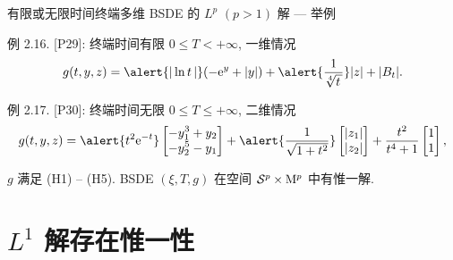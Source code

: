 \documentclass[xcolor=svgnames,serif,table,10pt]{beamer}
\newcommand{\s}{\mathcal{S}}
\newcommand{\me}{\mathrm{e}}
\renewcommand{\M}{{\rm M}}
\begin{document}
\begin{frame}{有限或无限时间终端多维 BSDE 的 $L^p$ $(p>1)$ 解 --- 举例}

  \begin{exampleblock}{例 2.16. [P29]: 终端时间有限 $0\leq T<+\infty$, 一维情况}
    $$g(t,y,z)=\alert{|\ln t\,|}(-\me^{y}+|y|)+\alert{\frac{1}{\sqrt[4]{t\,}}}|z|+|B_t|.$$
  \end{exampleblock}\pause

  \begin{exampleblock}{例 2.17. [P30]: 终端时间无限 $0\leq T\leq +\infty$, 二维情况}
    \begin{equation*}
      g(t,y,z)=\alert{t^2\me^{-t}}
      \begin{bmatrix}
        \displaystyle-y^3_1+y_2\\
        \displaystyle-y^5_2-y_1
      \end{bmatrix}
      +\alert{\frac{1}{\sqrt{1+t^2}}}
      \begin{bmatrix}
        \displaystyle|z_1|\\
        \displaystyle|z_2|
      \end{bmatrix}
      +\frac{t^2}{t^4+1}
      \begin{bmatrix}
        \displaystyle 1\\
        \displaystyle 1
      \end{bmatrix},
    \end{equation*}
  \end{exampleblock}

  \qquad $g$ 满足 (H1) -- (H5). BSDE $(\xi,T,g)$ 在空间 $\s^p\times\M^p$
  中有惟一解.
\end{frame}

\section{$L^1$ 解存在惟一性}

\end{document}
